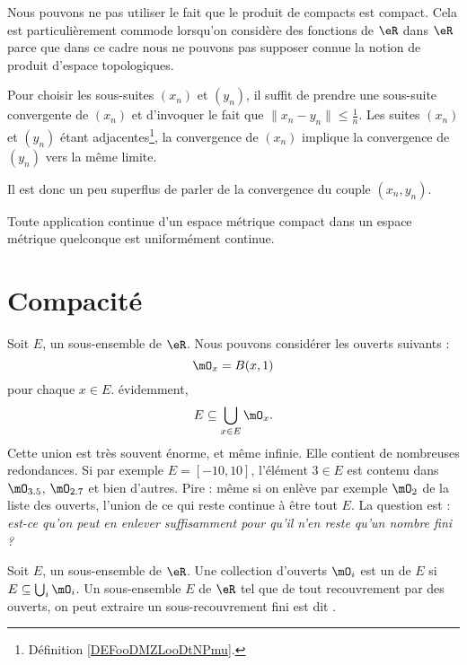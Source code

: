 \begin{remark}
    Nous pouvons ne pas utiliser le fait que le produit de compacts est compact. Cela est particulièrement commode lorsqu'on considère des fonctions de \( \eR\) dans \( \eR\) parce que dans ce cadre nous ne pouvons pas supposer connue la notion de produit d'espace topologiques.

    Pour choisir les sous-suites \( (x_n)\) et \( (y_n)\), il suffit de prendre une sous-suite convergente de \( (x_n)\) et d'invoquer le fait que \( \| x_n-y_n \|\leq \frac{1}{ n }\). Les suites \( (x_n)\) et \( (y_n)\) étant adjacentes\footnote{Définition \ref{DEFooDMZLooDtNPmu}.}, la convergence de \( (x_n)\) implique la convergence de \( (y_n)\) vers la même limite.

    Il est donc un peu superflus de parler de la convergence du couple \( (x_n,y_n)\).
\end{remark}

\begin{proposition}     \label{PROPooBWUFooYhMlDp}
    Toute application continue d'un espace métrique compact dans un espace métrique quelconque est uniformément continue.
\end{proposition}

\section{Compacité}

Soit $E$, un sous-ensemble de $\eR$. Nous pouvons considérer les ouverts suivants :
\begin{equation}
    \mO_x=B(x,1)
\end{equation}
pour chaque $x\in E$. évidemment,
\begin{equation}
    E\subseteq \bigcup_{x\in E}\mO_x.
\end{equation}
Cette union est très souvent énorme, et même infinie. Elle contient de nombreuses redondances. Si par exemple $E=[-10,10]$, l'élément $3\in E$ est contenu dans $\mO_{3.5}$, $\mO_{2.7}$ et bien d'autres. Pire : même si on enlève par exemple $\mO_2$ de la liste des ouverts, l'union de ce qui reste continue à être tout $E$. La question est : \emph{est-ce qu'on peut en enlever suffisamment pour qu'il n'en reste qu'un nombre fini ?}
\begin{definition}
Soit $E$, un sous-ensemble de $\eR$. Une collection d'ouverts $\mO_i$ est un  de $E$ si $E\subseteq \bigcup_{i}\mO_i$. Un sous-ensemble $E$ de $\eR$ tel que de tout recouvrement par des ouverts, on peut extraire un sous-recouvrement fini est dit .
\end{definition}

